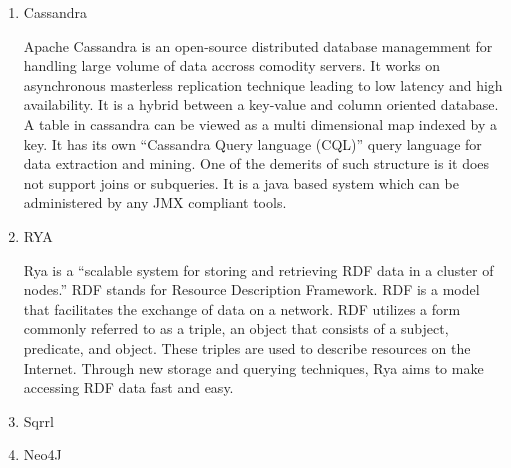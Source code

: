 \begin{enumerate}
\item {} 
Cassandra

Apache Cassandra \label{\detokenize{i524/technologies:id442}}{\hyperref[\detokenize{i524/technologies:www-cassandra}]{\sphinxcrossref{{[}379{]}}}} is an open-source
distributed database managemment for handling large volume of
data accross comodity servers. It works on asynchronous
masterless replication technique leading to low latency and high
availability. It is a hybrid between a key-value and column
oriented database. A table in cassandra can be viewed as a multi
dimensional map indexed by a key. It has its own ``Cassandra Query
language (CQL)'' query language for data extraction and
mining. One of the demerits of such structure is it does not
support joins or subqueries. It is a java based system which can
be administered by any JMX compliant tools.

\item {} 
RYA

Rya is a “scalable system for storing and retrieving RDF data in
a cluster of nodes.” \label{\detokenize{i524/technologies:id443}}{\hyperref[\detokenize{i524/technologies:punnoose}]{\sphinxcrossref{{[}380{]}}}} RDF stands for Resource
Description Framework. \label{\detokenize{i524/technologies:id444}}{\hyperref[\detokenize{i524/technologies:punnoose}]{\sphinxcrossref{{[}380{]}}}} RDF is a model that
facilitates the exchange of data on a network. \label{\detokenize{i524/technologies:id445}}{\hyperref[\detokenize{i524/technologies:w3}]{\sphinxcrossref{{[}381{]}}}} RDF
utilizes a form commonly referred to as a triple, an object that
consists of a subject, predicate, and object. \label{\detokenize{i524/technologies:id446}}{\hyperref[\detokenize{i524/technologies:punnoose}]{\sphinxcrossref{{[}380{]}}}}
These triples are used to describe resources on the
Internet. \label{\detokenize{i524/technologies:id447}}{\hyperref[\detokenize{i524/technologies:punnoose}]{\sphinxcrossref{{[}380{]}}}} Through new storage and querying
techniques, Rya aims to make accessing RDF data fast and
easy. \label{\detokenize{i524/technologies:id448}}{\hyperref[\detokenize{i524/technologies:apacherya}]{\sphinxcrossref{{[}382{]}}}}

\item {} 
Sqrrl

\item {} 
Neo4J


\end{enumerate}
